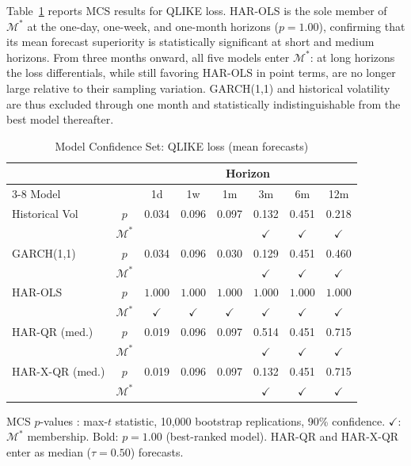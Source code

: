 Table~\ref{tab:mcs-qlike} reports MCS results for QLIKE loss.
HAR-OLS is the sole member of $\mathcal{M}^{*}$ at the one-day, one-week,
and one-month horizons ($p = 1.00$), confirming that its mean forecast
superiority is statistically significant at short and medium horizons.
From three months onward, all five models enter $\mathcal{M}^{*}$: at
long horizons the loss differentials, while still favoring HAR-OLS in
point terms, are no longer large relative to their sampling variation.
GARCH(1,1) and historical volatility are thus excluded through one month
and statistically indistinguishable from the best model thereafter.

\begin{table}[htbp]
\centering
\small
\caption{Model Confidence Set: QLIKE loss (mean forecasts)}
\label{tab:mcs-qlike}
\begin{tabular}{lccccccc}
\toprule
 & & \multicolumn{6}{c}{Horizon} \\
\cmidrule(lr){3-8}
Model & & 1d & 1w & 1m & 3m & 6m & 12m \\
\midrule
Historical Vol    & $p$ & 0.034 & 0.096 & 0.097 & 0.132 & 0.451 & 0.218 \\
                  & $\mathcal{M}^{*}$ &  &  &  & $\checkmark$ & $\checkmark$ & $\checkmark$ \\
\addlinespace
GARCH(1,1)        & $p$ & 0.034 & 0.096 & 0.030 & 0.129 & 0.451 & 0.460 \\
                  & $\mathcal{M}^{*}$ &  &  &  & $\checkmark$ & $\checkmark$ & $\checkmark$ \\
\addlinespace
HAR-OLS           & $p$ & $\mathbf{1.000}$ & $\mathbf{1.000}$ & $\mathbf{1.000}$ & $\mathbf{1.000}$ & $\mathbf{1.000}$ & $\mathbf{1.000}$ \\
                  & $\mathcal{M}^{*}$ & $\checkmark$ & $\checkmark$ & $\checkmark$ & $\checkmark$ & $\checkmark$ & $\checkmark$ \\
\addlinespace
HAR-QR (med.)     & $p$ & 0.019 & 0.096 & 0.097 & 0.514 & 0.451 & 0.715 \\
                  & $\mathcal{M}^{*}$ &  &  &  & $\checkmark$ & $\checkmark$ & $\checkmark$ \\
\addlinespace
HAR-X-QR (med.)   & $p$ & 0.019 & 0.096 & 0.097 & 0.132 & 0.451 & 0.715 \\
                  & $\mathcal{M}^{*}$ &  &  &  & $\checkmark$ & $\checkmark$ & $\checkmark$ \\
\bottomrule
\end{tabular}
\par\smallskip
{\footnotesize MCS $p$-values \parencite{hansen2011model}: max-$t$ statistic, 10,000 bootstrap replications, 90\% confidence. $\checkmark$: $\mathcal{M}^{*}$ membership. Bold: $p = 1.00$ (best-ranked model). HAR-QR and HAR-X-QR enter as median ($\tau = 0.50$) forecasts.}
\end{table}

